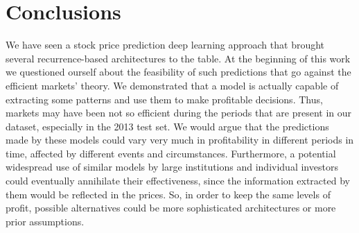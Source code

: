 \documentclass{article}
\begin{document}
\section{Conclusions}

We have seen a stock price prediction deep learning approach that brought several
recurrence-based architectures to the table. At the beginning of this work we questioned
ourself about the feasibility of such predictions that go against the efficient markets'
theory. We demonstrated that a model is actually capable of extracting some patterns and
use them to make profitable decisions. Thus, markets may have been not so efficient during
the periods that are present in our dataset, especially in the 2013 test set. We would
argue that the predictions made by these models could vary very much in profitability
in different periods in time, affected by different events and circumstances. Furthermore,
a potential widespread use of similar models by large institutions and individual investors
could eventually annihilate their effectiveness, since the information extracted by them would
be reflected in the prices. So, in order to keep the same levels of profit, possible
alternatives could be more sophisticated architectures or more prior assumptions.  




\end{document}
